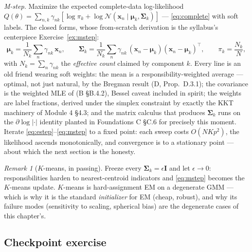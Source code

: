 \documentclass[11pt]{article}
\numberwithin{equation}{section}
\theoremstyle{plain}
\theoremstyle{definition}
\theoremstyle{remark}
\newtheorem{remark}[theorem]{Remark}
\newcounter{exercise}
\newcommand{\Normal}{\mathcal{N}}
\newcommand{\x}{\bm{x}}
\newcommand{\T}{\top}
\newcommand{\bmu}{\bm{\mu}}
\newcommand{\bSigma}{\bm{\Sigma}}
\newcommand{\resp}{\gamma}
\begin{document}
\emph{M-step.} Maximize the expected complete-data log-likelihood $Q(\theta) = \sum_{n,k} \resp_{nk} [\log \pi_k + \log \Normal(\x_n \mid \bmu_k, \bSigma_k)]$ --- \eqref{eq:complete} with soft labels. The closed forms, whose from-scratch derivation is the syllabus's centerpiece Exercise~\ref{ex:mstep}:
\begin{equation}
\bmu_k = \frac{1}{N_k} \sum_{n} \resp_{nk}\, \x_n,
\qquad
\bSigma_k = \frac{1}{N_k} \sum_{n} \resp_{nk}\, (\x_n - \bmu_k)(\x_n - \bmu_k)^\T,
\qquad
\pi_k = \frac{N_k}{N},
\label{eq:mstep}
\end{equation}
with $N_k = \sum_n \resp_{nk}$ the \emph{effective count} claimed by component $k$. Every line is an old friend wearing soft weights: the mean is a responsibility-weighted average --- optimal, not just natural, by the Bregman result (D, Prop.\ D.3.1); the covariance is the weighted MLE of (B \S B.4.2), Bessel caveat included in spirit; the weights are label fractions, derived under the simplex constraint by exactly the KKT machinery of Module 4 \S4.3; and the matrix calculus that produces $\bSigma_k$ runs on the $\partial \log|\cdot|$ identity planted in Foundations C \S C.6 for precisely this moment. Iterate \eqref{eq:estep}--\eqref{eq:mstep} to a fixed point: each sweep costs $O(NKp^2)$, the likelihood ascends monotonically, and convergence is to a stationary point --- about which the next section is the honesty.

\begin{remark}[$K$-means, in passing]
Freeze every $\bSigma_k = \epsilon \bm I$ and let $\epsilon \to 0$: responsibilities harden to nearest-centroid indicators and \eqref{eq:mstep} becomes the $K$-means update. $K$-means is hard-assignment EM on a degenerate GMM --- which is why it is the standard \emph{initializer} for EM (cheap, robust), and why its failure modes (sensitivity to scaling, spherical bias) are the degenerate cases of this chapter's.
\end{remark}


\subsection*{Checkpoint exercise}
\end{document}
